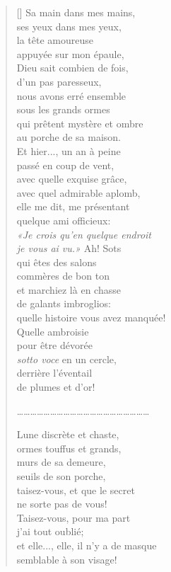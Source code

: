 \documentclass[a4paper,12pt]{book}
\begin{document}
\begin{verse}[\versewidth]
  Sa main dans mes mains, \\
  ses yeux dans mes yeux, \\
  la tête amoureuse \\
  appuyée sur mon épaule, \\
  Dieu sait combien de fois, \\
  d'un pas paresseux, \\
  nous avons erré ensemble \\
  sous les grands ormes \\
  qui prêtent mystère et ombre \\
  au porche de sa maison. \\
  Et hier..., un an à peine \\
  passé en coup de vent, \\
  avec quelle exquise grâce, \\
  avec quel admirable aplomb, \\
  elle me dit, me présentant  \\
  quelque ami officieux: \\
  \emph{«Je crois qu'en quelque endroit \\
    je vous ai vu.»} Ah! Sots \\
  qui êtes des salons \\
  commères de bon ton \\
  et marchiez là en chasse \\
  de galants imbroglios: \\
  quelle histoire vous avez manquée! \\
  Quelle ambroisie \\
  pour être dévorée \\
  \emph{sotto voce} en un cercle, \\
  derrière l'éventail \\
  de plumes et d'or!

\ldots\ldots\ldots\ldots\ldots\ldots\ldots\ldots\ldots\ldots\ldots\ldots\ldots\ldots\ldots\ldots\ldots\ldots\ldots\ldots

  Lune discrète et chaste, \\
  ormes touffus et grands, \\
  murs de sa demeure, \\
  seuils de son porche, \\
  taisez-vous, et que le secret \\
  ne sorte pas de vous! \\
  Taisez-vous, pour ma part \\
  j'ai tout oublié; \\
  et elle..., elle, il n'y a de masque \\
  semblable à son visage!
\end{verse}
\end{document}
